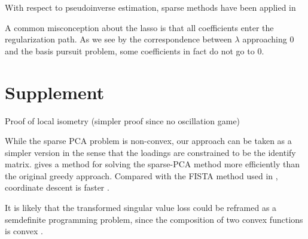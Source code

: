 \documentclass[a4paper,11pt]{article}
\begin{document}
With respect to pseudoinverse estimation, sparse methods have been applied in \cite{Sun2012-vp}

A common misconception %
about the lasso is that all coefficients enter the regularization path.
As we see by the correspondence between $\lambda$ approaching $0$ and the basis pursuit problem, some coefficients in fact do not go to $0$. 
\section{Supplement}


Proof of local isometry (simpler proof since no oscillation game)

While the sparse PCA problem is non-convex, our approach can be taken as a simpler version in the sense that the loadings are constrained to be the identify matrix.
\cite{Bertsimas2022-qo} gives a method for solving the sparse-PCA method more efficiently than the original greedy approach.
Compared with the FISTA method used in  \cite{Koelle2022-ju, Koelle2024-no}, coordinate descent \cite{Meier2008-ts, Qin2013-tx} is faster \cite{Zhao2023-xn}.

It is likely that the transformed singular value loss could be reframed as a semdefinite programming problem, since the composition of two convex functions is convex \cite{Boyd2004-ql}.




\end{document}
